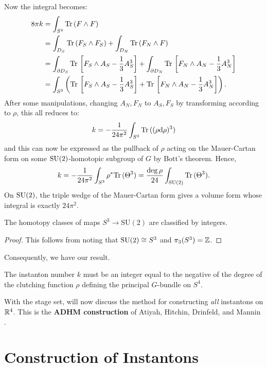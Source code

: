 		Now the integral becomes:
		\[
		\begin{aligned}
			8\pi k &= \int_{S^4} \mathrm{Tr}\, (F \wedge F)\\
				   &= \int_{D_S} \mathrm{Tr}\, (F_S \wedge F_S) + \int_{D_N} \mathrm{Tr}\, (F_N \wedge F)\\
				   &= \int_{\partial D_S} \mathrm{Tr}\, \left[F_S \wedge A_S - \frac13 A_S^3 \right] 
				   + \int_{\partial D_N} \mathrm{Tr}\, \left[F_N \wedge A_N - \frac13 A_N^3 \right]\\
				   &= \int_{S^3} \left( \mathrm{Tr}\, \left[F_S \wedge A_S - \frac13 A_S^3 \right] + \mathrm{Tr}\, \left[F_N \wedge A_N - \frac13 A_N^3 \right] \right).
		\end{aligned}
		\]
		After some manipulations, changing $A_N, F_N$ to $A_S, F_S$ by transforming according to $\rho$, this all reduces to:
		\[
			k = - \frac{1}{24\pi^2} \int_{S^3} \mathrm{Tr}\,((\rho \mathrm{d} \rho)^3)
		\]
		and this can now be expressed as the pullback of $\rho$ acting on the Mauer-Cartan form on some $\mathrm{SU}(2)$-homotopic subgroup of $G$ by Bott's theorem. Hence,
		\[
			k = - \frac{1}{24\pi^2} \int_{S^3} \rho^* \mathrm{Tr}\,(\Theta^3) = \frac{\deg \rho}{24} \int_{\mathrm{SU}(2)} \mathrm{Tr}\,(\Theta^3).
		\]
		On $\mathrm{SU}(2)$, the triple wedge of the Mauer-Cartan form gives a volume form whose integral is exactly $24\pi^2$.

		\begin{prop}
			The homotopy classes of maps $S^3 \to \mathrm{SU}(2)$ are classified by integers.
		\end{prop}
		\begin{proof}
			This follows from noting that $\mathrm{SU}(2) \cong S^3$ and $\pi_3(S^3) = \mathbb{Z}$.
		\end{proof}
		\noindent Consequently, we have our result.
		\begin{prop}
			 The instanton number $k$ must be an integer equal to the negative of the degree of the clutching function $\rho$ defining the principal $G$-bundle on $S^4$.
		\end{prop}
		
		\noindent With the stage set, will now discuss the method for constructing \emph{all} instantons on $\mathbb{R}^4$. This is the \textbf{ADHM construction} of Atiyah, Hitchin, Drinfeld, and Mannin \cite{atiyah65}.



\section{Construction of Instantons} %
\label{sec:construction_of_instantons}
	
